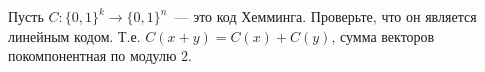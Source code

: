 Пусть $C: \{0, 1\}^k \to \{0, 1\}^n$~--- это код Хемминга. Проверьте, что он является линейным кодом. Т.е. $C(x + y) = C(x) +
C(y)$, сумма векторов покомпонентная по модулю $2$.